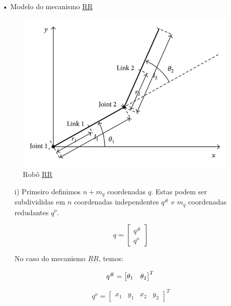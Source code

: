 \documentclass[12pt,a4paper]{article}
\begin{document}
\begin{itemize}

\item[•] Modelo do mecanismo \underline{R}\underline{R}

\begin{figure}[h!]
	\centering
	\includegraphics[scale=1.5]{RR.jpg}  
	\caption{Robô \underline{R}\underline{R}}
	\label{fig:figura2}
\end{figure}

	\begin{itemize}
	\item[i)] Primeiro definimos $n + m_q$ coordenadas  $q$. Estas podem ser subdivididas em $n$ coordenadas independentes $q^{\#}$ e $m_q$ 	coordenadas redudantes $q^o$.
	
	$$
	q = \begin{bmatrix}
	q^{\#} \\
	q^o
	\end{bmatrix}
	$$

	No caso do mecanismo $\underline{R}\underline{R}$, temos:

	\begin{equation}
	q^{\#} = \begin{bmatrix}
	\theta_1 & \theta_2
	\end{bmatrix}^T \\
	\end{equation}
	
	\begin{equation}
	q^o = \begin{bmatrix}
	x_1 & y_1 & x_2 & y_2
	\end{bmatrix}^T
	\end{equation}


\end{itemize}
\end{itemize}
\end{document}
